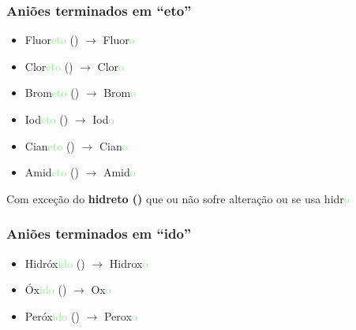 \documentclass[12pt]{report}
\begin{document}
\hypertarget{regras5}{}%
\subsubsection{Aniões terminados em ``eto''}

\begin{multicols}{2}
	
	\begin{itemize}
	\item 
		Fluor\textcolor{LightGreen}{eto} ()
		$\to$ Fluor\textcolor{LightGreen}{o}
 	\item 
		Clor\textcolor{LightGreen}{eto} ()
		$\to$ Clor\textcolor{LightGreen}{o}
	\item 
		Brom\textcolor{LightGreen}{eto} ()
		$\to$ Brom\textcolor{LightGreen}{o}
	\item
		Iod\textcolor{LightGreen}{eto} ()
		$\to$ Iod\textcolor{LightGreen}{o}
	\item
		Cian\textcolor{LightGreen}{eto} ()
		$\to$ Cian\textcolor{LightGreen}{o}
	\item
		Amid\textcolor{LightGreen}{eto} ()
		$\to$ Amid\textcolor{LightGreen}{o}
	\end{itemize}

\end{multicols}

Com exceção do \textbf{hidreto ()} que ou não sofre alteração ou se usa hidr\textcolor{LightGreen}{o}

\hypertarget{regras6}{}%
\subsubsection{Aniões terminados em ``ido''}

\begin{multicols}{2}
	
	\begin{itemize}
	\item 
		Hidróx\textcolor{LightGreen}{ido} ()
		$\to$ Hidrox\textcolor{LightGreen}{o}
	\item 
		Óx\textcolor{LightGreen}{ido} ()
		$\to$ Ox\textcolor{LightGreen}{o}
	\item
		Peróx\textcolor{LightGreen}{ido} ()
		$\to$ Perox\textcolor{LightGreen}{o}
	\end{itemize}

\end{multicols}

\hypertarget{regras7}{}%
\end{document}
